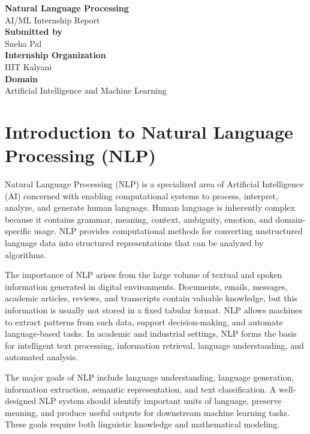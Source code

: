 \documentclass[10pt]{article}
\begin{document}
\begin{titlepage}
    \centering
    \vspace*{2cm}
    {\Huge \textbf{Natural Language Processing}}\\[0.5cm]
    {\Large AI/ML Internship Report}\\[1.5cm]

    \textbf{Submitted by}\\[0.3cm]
    Sneha Pal\\[1cm]

    \textbf{Internship Organization}\\[0.3cm]
    IIIT Kalyani\\[1cm]

    \textbf{Domain}\\[0.3cm]
    Artificial Intelligence and Machine Learning\\[1cm]

    \vfill
\end{titlepage}

\newpage

\section{Introduction to Natural Language Processing (NLP)}

Natural Language Processing (NLP) is a specialized area of Artificial Intelligence (AI) concerned with enabling computational systems to process, interpret, analyze, and generate human language. Human language is inherently complex because it contains grammar, meaning, context, ambiguity, emotion, and domain-specific usage. NLP provides computational methods for converting unstructured language data into structured representations that can be analyzed by algorithms.

The importance of NLP arises from the large volume of textual and spoken information generated in digital environments. Documents, emails, messages, academic articles, reviews, and transcripts contain valuable knowledge, but this information is usually not stored in a fixed tabular format. NLP allows machines to extract patterns from such data, support decision-making, and automate language-based tasks. In academic and industrial settings, NLP forms the basis for intelligent text processing, information retrieval, language understanding, and automated analysis.

The major goals of NLP include language understanding, language generation, information extraction, semantic representation, and text classification. A well-designed NLP system should identify important units of language, preserve meaning, and produce useful outputs for downstream machine learning tasks. These goals require both linguistic knowledge and mathematical modeling.
\end{document}

